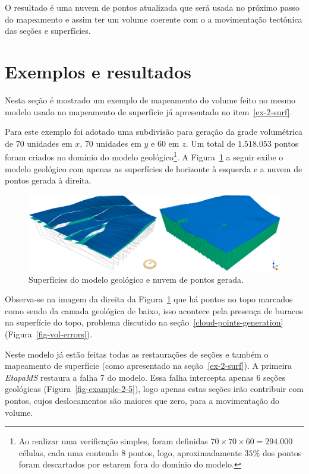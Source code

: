 O resultado é uma nuvem de pontos atualizada que será usada no próximo passo do mapeamento e assim ter um volume coerente com o a movimentação tectônica das seções e superfícies.

\section{Exemplos e resultados}

Nesta seção é mostrado um exemplo de mapeamento do volume feito no mesmo modelo usado no mapeamento de superfície já apresentado no item~\ref{ex-2-surf}.

Para este exemplo foi adotado uma subdivisão para geração da grade volumétrica de $70$ unidades em $x$, $70$ unidades em $y$ e $60$ em $z$. Um total de $1.518.053$ pontos foram criados no domínio do modelo geológico\footnote{Ao realizar uma verificação simples, foram definidas $70\times70\times60=294.000$ células, cada uma contendo $8$ pontos, logo, aproximadamente $35\%$ dos pontos foram descartados por estarem fora do domínio do modelo.}. A Figura~\ref{fig-vol-ex-1} a seguir exibe o modelo geológico com apenas as superfícies de horizonte à esquerda e a nuvem de pontos gerada à direita.

\begin{figure} [H]
  \begin{center}
    \includegraphics[width=\textwidth]{images/fig-vol-ex-1}
    \caption{Superfícies do modelo geológico e nuvem de pontos gerada.}\label{fig-vol-ex-1}
  \end{center}
\end{figure}

Observa-se na imagem da direita da Figura~\ref{fig-vol-ex-1} que há pontos no topo marcados como sendo da camada geológica de baixo, isso acontece pela presença de buracos na superfície do topo, problema discutido na seção~\ref{cloud-points-generation} (Figura~\ref{fig-vol-errors}).

Neste modelo já estão feitas todas as restaurações de seções e também o mapeamento de superfície (como apresentado na seção~\ref{ex-2-surf}). A primeira \emph{EtapaMS} restaura a falha 7 do modelo. Essa falha intercepta apenas 6 seções geológicas (Figura~\ref{fig-example-2-5}), logo apenas estas seções irão contribuir com pontos, cujos deslocamentos são maiores que zero, para a movimentação do volume. 

